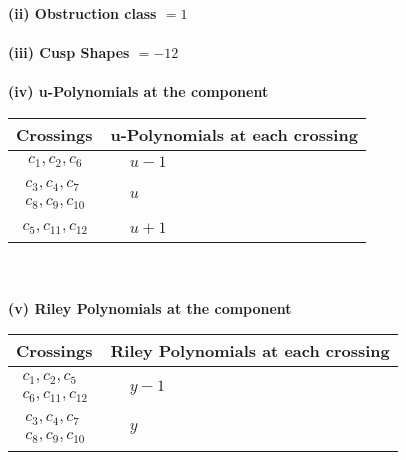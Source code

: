 \documentclass[1p]{elsarticle_modified}
\theoremstyle{definition}
\begin{document}
\flushleft \textbf{(ii) Obstruction class $= 1$}\\~\\
\flushleft \textbf{(iii) Cusp Shapes $= -12$}\\~\\
\newpage\renewcommand{\arraystretch}{1}
\flushleft \textbf{(iv) u-Polynomials at the component}\newline \\
\begin{tabular}{m{50pt}|m{274pt}}
Crossings & \hspace{64pt}u-Polynomials at each crossing \\
\hline $$\begin{aligned}c_{1},c_{2},c_{6}\end{aligned}$$&$\begin{aligned}
&u-1
\end{aligned}$\\
\hline $$\begin{aligned}c_{3},c_{4},c_{7}\\c_{8},c_{9},c_{10}\end{aligned}$$&$\begin{aligned}
&u
\end{aligned}$\\
\hline $$\begin{aligned}c_{5},c_{11},c_{12}\end{aligned}$$&$\begin{aligned}
&u+1
\end{aligned}$\\
\hline
\end{tabular}\\~\\
\newpage\renewcommand{\arraystretch}{1}
\flushleft \textbf{(v) Riley Polynomials at the component}\newline \\
\begin{tabular}{m{50pt}|m{274pt}}
Crossings & \hspace{64pt}Riley Polynomials at each crossing \\
\hline $$\begin{aligned}c_{1},c_{2},c_{5}\\c_{6},c_{11},c_{12}\end{aligned}$$&$\begin{aligned}
&y-1
\end{aligned}$\\
\hline $$\begin{aligned}c_{3},c_{4},c_{7}\\c_{8},c_{9},c_{10}\end{aligned}$$&$\begin{aligned}
&y
\end{aligned}$\\
\hline
\end{tabular}\\~\\
\end{document}
